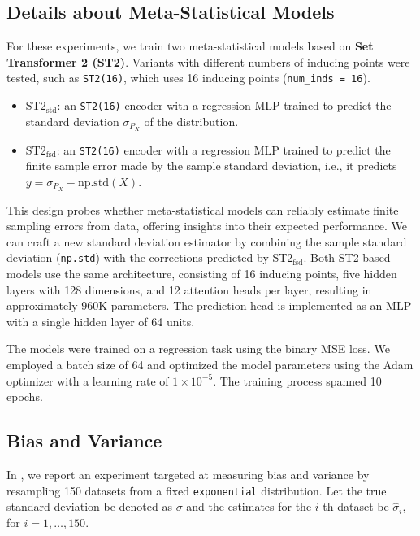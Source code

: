 \subsection{Details about Meta-Statistical Models}
For these experiments, we train two meta-statistical models based on \textbf{Set Transformer 2 (ST2)}. Variants with different numbers of inducing points were tested, such as \texttt{ST2(16)}, which uses 16 inducing points (\texttt{num\_inds = 16}).
\begin{itemize}
    \item ST2$_{\text{std}}$: an \texttt{ST2(16)} encoder with a regression MLP trained to predict the standard deviation \(\sigma_{P_X}\) of the distribution.
    \item ST2$_{\text{fsd}}$: an \texttt{ST2(16)} encoder with a regression MLP trained to predict the finite sample error made by the sample standard deviation, i.e., it predicts \(y = \sigma_{P_X} - \text{np.std}(X)\).
\end{itemize}

This design probes whether meta-statistical models can reliably estimate finite sampling errors from data, offering insights into their expected performance. We can craft a new standard deviation estimator by combining the sample standard deviation (\texttt{np.std}) with the corrections predicted by ST2$_{\text{fsd}}$. Both ST2-based models use the same architecture, consisting of 16 inducing points, five hidden layers with 128 dimensions, and 12 attention heads per layer, resulting in approximately 960K parameters. The prediction head is implemented as an MLP with a single hidden layer of 64 units.

The models were trained on a regression task using the binary MSE loss. We employed a batch size of 64 and optimized the model parameters using the Adam optimizer with a learning rate of \(1 \times 10^{-5}\). The training process spanned 10 epochs. 


\subsection{Bias and Variance}
In , we report an experiment targeted at measuring bias and variance by resampling 150 datasets from a fixed \texttt{exponential} distribution. Let the true standard deviation be denoted as \( \sigma \) and the estimates for the \( i\)-th dataset be \( \hat{\sigma}_i \), for \( i = 1, \dots, 150 \).

